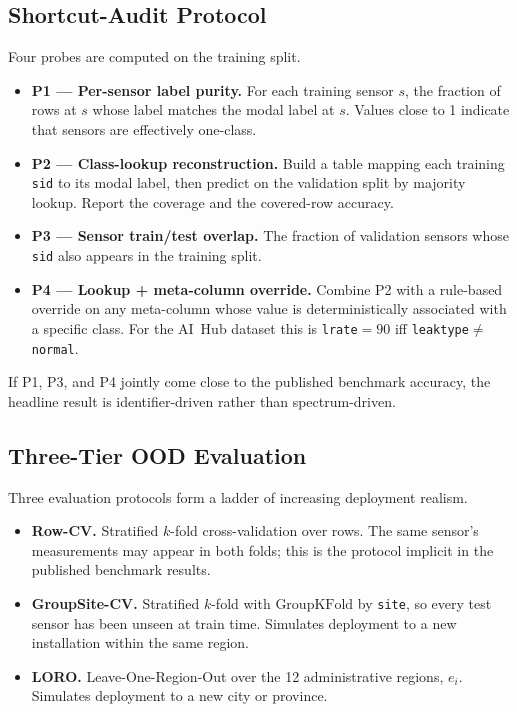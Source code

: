 \documentclass[sensors,article,submit,pdftex,oneauthor]{Definitions/mdpi}
\begin{document}
\subsection{Shortcut-Audit Protocol}\label{sec:method-audit}

Four probes are computed on the training split.

\begin{itemize}
\item \textbf{P1 --- Per-sensor label purity.} For each
training sensor $s$, the fraction of rows at $s$ whose label
matches the modal label at $s$. Values close to 1 indicate
that sensors are effectively one-class.

\item \textbf{P2 --- Class-lookup reconstruction.} Build a
table mapping each training \texttt{sid} to its modal
label, then predict on the validation split by majority
lookup. Report the coverage and the covered-row accuracy.

\item \textbf{P3 --- Sensor train/test overlap.} The fraction
of validation sensors whose \texttt{sid} also appears in the
training split.

\item \textbf{P4 --- Lookup + meta-column override.} Combine
P2 with a rule-based override on any meta-column whose value
is deterministically associated with a specific class. For the
AI~Hub dataset this is \texttt{lrate}$=90$ iff
\texttt{leaktype}$\neq$\texttt{normal}.
\end{itemize}

If P1, P3, and P4 jointly come close to the published
benchmark accuracy, the headline result is identifier-driven
rather than spectrum-driven.

\subsection{Three-Tier OOD Evaluation}\label{sec:method-ood}

Three evaluation protocols form a ladder of increasing
deployment realism.

\begin{itemize}
\item \textbf{Row-CV.} Stratified $k$-fold cross-validation
over rows. The same sensor's measurements may appear in both
folds; this is the protocol implicit in the published
benchmark results.

\item \textbf{GroupSite-CV.} Stratified $k$-fold with
$\text{GroupKFold}$ by \texttt{site}, so every test sensor has
been unseen at train time. Simulates deployment to a new
installation within the same region.

\item \textbf{LORO.} Leave-One-Region-Out over the 12
administrative regions, $e_i$. Simulates deployment to a
new city or province.
\end{itemize}
\end{document}
